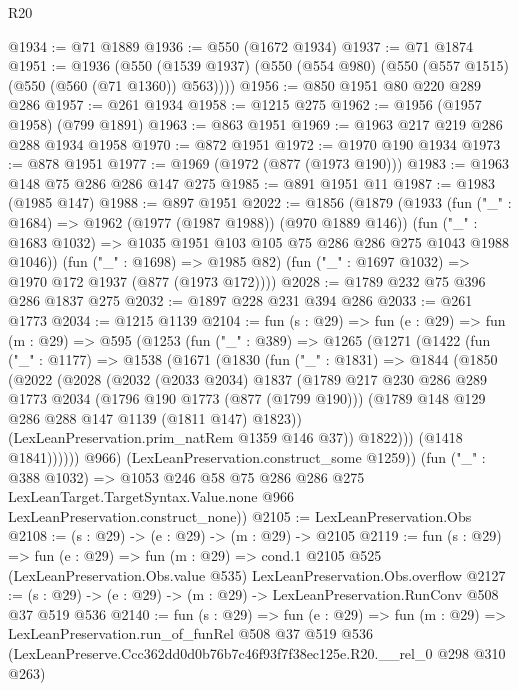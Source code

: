 \begin{lexlean}{R20}
\begin{coremodule}
@1934 := @71 @1889
@1936 := @550 (@1672 @1934)
@1937 := @71 @1874
@1951 := @1936
    (@550 (@1539 @1937) (@550 (@554 @980) (@550 (@557 @1515) (@550 (@560 (@71 @1360)) @563))))
@1956 := @850 @1951 @80 @220 @289 @286
@1957 := @261 @1934
@1958 := @1215 @275
@1962 := @1956 (@1957 @1958) (@799 @1891)
@1963 := @863 @1951
@1969 := @1963 @217 @219 @286 @288 @1934 @1958
@1970 := @872 @1951
@1972 := @1970 @190 @1934
@1973 := @878 @1951
@1977 := @1969 (@1972 (@877 (@1973 @190)))
@1983 := @1963 @148 @75 @286 @286 @147 @275
@1985 := @891 @1951 @11
@1987 := @1983 (@1985 @147)
@1988 := @897 @1951
@2022 := @1856
    (@1879
      (@1933
        (fun ("_" : @1684) => @1962 (@1977 (@1987 @1988)) (@970 @1889 @146))
        (fun ("_" : @1683 @1032) => @1035 @1951 @103 @105 @75 @286 @286 @275 @1043 @1988 @1046))
      (fun ("_" : @1698) => @1985 @82)
      (fun ("_" : @1697 @1032) => @1970 @172 @1937 (@877 (@1973 @172))))
@2028 := @1789 @232 @75 @396 @286 @1837 @275
@2032 := @1897 @228 @231 @394 @286
@2033 := @261 @1773
@2034 := @1215 @1139
@2104 := fun (s : @29) =>
  fun (e : @29) =>
  fun (m : @29) =>
  @595
    (@1253
      (fun ("_" : @389) =>
      @1265
        (@1271
          (@1422
            (fun ("_" : @1177) =>
            @1538
              (@1671
                (@1830
                  (fun ("_" : @1831) =>
                  @1844
                    (@1850
                      (@2022
                        (@2028
                          (@2032
                            (@2033 @2034)
                            @1837
                            (@1789
                              @217
                              @230
                              @286
                              @289
                              @1773
                              @2034
                              (@1796 @190 @1773 (@877 (@1799 @190)))
                              (@1789 @148 @129 @286 @288 @147 @1139 (@1811 @147) @1823))
                            (LexLeanPreservation.prim_natRem @1359 @146 @37))
                          @1822)))
                    (@1418 @1841))))))
          @966)
        (LexLeanPreservation.construct_some @1259))
      (fun ("_" : @388 @1032) =>
      @1053
        @246
        @58
        @75
        @286
        @286
        @275
        LexLeanTarget.TargetSyntax.Value.none
        @966
        LexLeanPreservation.construct_none))
@2105 := LexLeanPreservation.Obs
@2108 := (s : @29) -> (e : @29) -> (m : @29) -> @2105
@2119 := fun (s : @29) =>
  fun (e : @29) =>
  fun (m : @29) =>
  cond.{1} @2105 @525 (LexLeanPreservation.Obs.value @535) LexLeanPreservation.Obs.overflow
@2127 := (s : @29) -> (e : @29) -> (m : @29) -> LexLeanPreservation.RunConv @508 @37 @519 @536
@2140 := fun (s : @29) =>
  fun (e : @29) =>
  fun (m : @29) =>
  LexLeanPreservation.run_of_funRel
    @508
    @37
    @519
    @536
    (LexLeanPreserve.Ccc362dd0d0b76b7c46f93f7f38ec125e.R20.__rel_0 @298 @310 @263)
\end{coremodule}
\end{lexlean}

